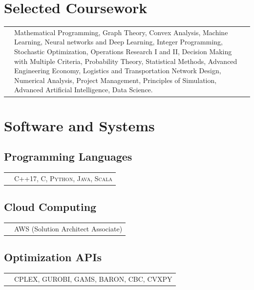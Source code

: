 \documentclass[10PT,letter]{article}
\newcommand{\subsectionstyle}[1]{\normalfont\selectfont\textcolor{titlecol}{\sffamily #1}}
\newcommand{\numbox}[1]{} %
\begin{document}
    \section*{\numbox{7}\bfseries\textcolor{titlecol}{\sffamily Selected Coursework}}
			\begin{tabular}{p{0.1in}p{6.55in}}
				
				\textsc{} & 
									Mathematical Programming,  Graph Theory,  Convex Analysis,  Machine Learning, Neural networks and Deep Learning,  Integer Programming,  Stochastic Optimization, Operations Research I and II, Decision Making with Multiple Criteria, Probability Theory, Statistical Methods,  Advanced Engineering Economy,  Logistics and Transportation Network Design, Numerical Analysis, Project Management, Principles of Simulation, Advanced Artificial Intelligence, Data Science.\\[1mm]

			\end{tabular}




\section*{\numbox{9}\bfseries\textcolor{titlecol}{\sffamily Software and Systems}}
        	\subsection*{\subsectionstyle{Programming Languages}}
		            \begin{tabular}{p{0.2in}p{5.55in}}
		                & \textsc{C++17, C, Python, Java, Scala}
		            \end{tabular}
        
        \subsection*{\subsectionstyle{Cloud Computing}}
		        \begin{tabular}{p{.2in}p{5.55in}}
		        	 & \textsc{AWS} (Solution Architect Associate)
		        \end{tabular}
    
   	  	\subsection*{\subsectionstyle{Optimization  APIs}}
			    \begin{tabular}{p{.2in}p{5.55in}}
			     	& 	\textsc{CPLEX, GUROBI, GAMS, BARON, CBC, CVXPY}
			    \end{tabular}
\end{document}
